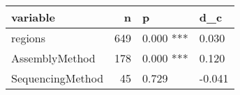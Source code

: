 \begin{table}[ht]
\centering
\begin{tabular}{lrll}
  \hline
variable & n & p & d\_c \\ 
  \hline
regions &  649 & 0.000 *** &  0.030 \\ 
  AssemblyMethod &  178 & 0.000 *** &  0.120 \\ 
  SequencingMethod &   45 & 0.729 & -0.041 \\ 
   \hline
\end{tabular}
\end{table}
